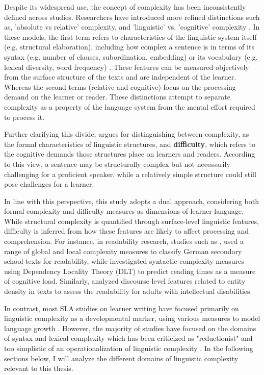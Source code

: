 Despite its widespread use, the concept of complexity has been inconsistently defined across studies. Researchers
have introduced more refined distinctions such as, 'absolute vs relative'
 complexity\citep{Miestamo2008, Butle2012}, and
'linguistic' vs. 'cognitive' complexity \citep{housen2009}. In these models, the first term refers to characteristics
of the linguistic system itself (e.g. structural elaboration), including how complex a sentence is in terms of its
syntax (e.g. number of clauses, subordination, embedding) or its vocabulary (e.g. lexical diversity, word frequency)
. These features can be measured objectively from the surface structure of the texts and are independent of the learner.
Whereas the second terms (relative and cognitive) focus on the processing demand on the learner or reader.
These distinctions attempt to separate complexity as a
property of the language system from the mental effort required to process it.

Further clarifying this divide, \citet{Pallotti2015} argues for distinguishing between complexity, as the formal
characteristics of linguistic structures, and \textbf{difficulty}, which refers to the cognitive demands those
structures place on learners and readers. According to this view, a sentence may be structurally complex but not
necessarily challenging for a proficient speaker, while a relatively simple structure could still pose challenges for
a learner.

 In line with this perspective, this study adopts a dual approach, considering both formal complexity and
difficulty measures as dimensions of learner language. While structural complexity is quantified through
surface-level linguistic features, difficulty is inferred from how these features are likely to affect processing and
comprehension. For instance, in readability research, studies such as \citet{Berendes2018}, used a range of
global and local complexity measures to classify German secondary school texts for readability, while
\citet{shain2016} investigated syntactic complexity measures using Dependency Locality Theory (DLT) to predict reading
times as a measure of cognitive load. Similarly, \citet{Feng2009} analyzed discourse level features related to
entity density in texts to assess the readability for adults with intellectual disabilities.

In contrast, most SLA studies on learner writing have focused primarily on linguistic complexity as a developmental
marker, using various measures to model language growth
\citep{Lu2010,Lu2011,Vyatkina2012,weiss2019,Iwashita2006,Wolfe1998, Ortega2003,NorrisOrtega2009}. However,
the majority of studies have focused on the domains of syntax and lexical complexity which has been criticized
as "reductionist" and too simplistic of an operationalization of linguistic complexity \citep{Butle2012}. In the
following sections below, I
will analyze the different domains of linguistic complexity relevant to this thesis.

